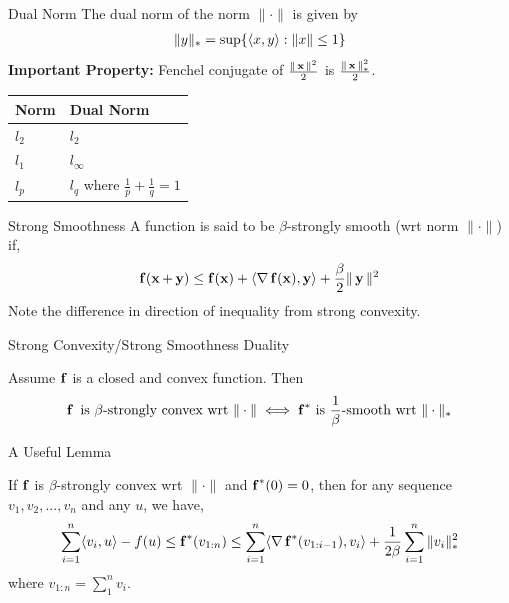 \begin{frame}{Dual Norm}
  The dual norm of the norm $\| \cdot \|$ is given by
  \begin{align*}
    \|y\|_{*} = \sup\{\langle {x} , {y} \rangle : \|x\| \le 1\}
  \end{align*}
      {\bf Important Property:} Fenchel conjugate of $\frac{\|\operatorname{\mathbf{x}}\|^2}{2}$ is $\frac{\|\operatorname{\mathbf{x}}\|_{*}^2}{2}$.
      \begin{center}
        \begin{tabular}{ll}
          Norm & Dual Norm\\
          \hline
          $l_2$ & $l_2$\\
          $l_1$ & $l_{\infty}$\\
          $l_p$ & $l_q$ where $\frac{1}{p}+\frac{1}{q}=1$\\
        \end{tabular}
      \end{center}
\end{frame}

\begin{frame}{Strong Smoothness}
  A function is said to be $\beta$-strongly smooth (wrt norm $\| \cdot \|$) if,
  \begin{align*}
    \operatorname{\mathbf{f}}(\operatorname{\mathbf{x}}+\operatorname{\mathbf{y}}) \le \operatorname{\mathbf{f}}(\operatorname{\mathbf{x}}) + \langle {\operatorname{\nabla}\operatorname{\mathbf{f}}(\operatorname{\mathbf{x}})} , {\operatorname{\mathbf{y}}} \rangle +\frac{\beta}{2} \|\operatorname{\mathbf{y}}\|^2
  \end{align*}
  Note the difference in direction of inequality from strong convexity.
\end{frame}

\begin{frame}{Strong Convexity/Strong Smoothness Duality}
  \begin{theorem}[6]
    Assume $\operatorname{\mathbf{f}}$ is a closed and convex function. Then
    \begin{align*}
      \operatorname{\mathbf{f}} \text{ is } \beta\text{-strongly convex wrt }  \| \cdot \| \iff {\operatorname{\mathbf{f}}}^{*} \text{ is } \frac{1}{\beta}\text{-smooth wrt }  \| \cdot \|_{*}
    \end{align*}
  \end{theorem}
\end{frame}

\begin{frame}{A Useful Lemma}
  \begin{lemma}
    If $\operatorname{\mathbf{f}}$ is $\beta$-strongly convex wrt $\|\cdot\|$ and ${\operatorname{\mathbf{f}}}^{*}(0)=0$, then for any sequence $v_1,v_2,...,v_n$ and any $u$, we have,
    \begin{align*}
      \sum_{i=1}^n \langle {v_i} , {u} \rangle - f(u) \le {\operatorname{\mathbf{f}}}^{*}(v_{1:n}) \le \sum_{i=1}^n \langle {\operatorname{\nabla}{\operatorname{\mathbf{f}}}^{*}(v_{1:i-1})} , {v_i} \rangle +\frac{1}{2\beta} \sum_{i=1}^n \|v_i\|_{*}^2
    \end{align*}
    where $v_{1:n}=\sum_1^n v_i$.
  \end{lemma}
\end{frame}

